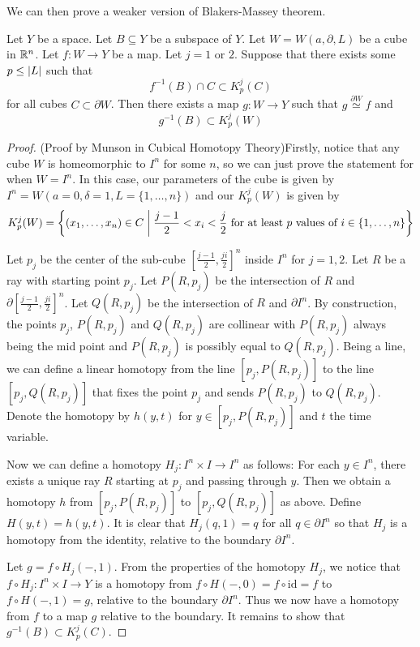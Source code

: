 We can then prove a weaker version of Blakers-Massey theorem. 

\begin{lmm}{}{} Let $Y$ be a space. Let $B\subseteq Y$ be a subspace of $Y$. Let $W=W(a,\partial, L)$ be a cube in $\mathbb{R}^n$. Let $f:W\to Y$ be a map. Let $j=1$ or $2$. Suppose that there exists some $p\leq\abs{L}$ such that $$f^{-1}(B)\cap C\subset K_p^j(C)$$ for all cubes $C\subset\partial W$. Then there exists a map $g:W\to Y$ such that $g\overset{\partial W}{\simeq} f$ and $$g^{-1}(B)\subset K_p^j(W)$$ 
\begin{proof}
(Proof by Munson in Cubical Homotopy Theory)Firstly, notice that any cube $W$ is homeomorphic to $I^n$ for some $n$, so we can just prove the statement for when $W=I^n$. In this case, our parameters of the cube is given by $I^n=W(a=0,\delta=1,L=\{1,\dots,n\})$ and our $K_p^j(W)$ is given by $$K_p^j(W)=\left\{(x_1,\dots,x_n)\in C\;\bigg{|}\;\frac{j-1}{2}<x_i<\frac{j}{2}\text{ for at least }p\text{ values of }i\in\{1,\dots,n\}\right\}$$

Let $p_j$ be the center of the sub-cube $\left[\frac{j-1}{2},\frac{ji}{2}\right]^n$ inside $I^n$ for $j=1,2$. Let $R$ be a ray with starting point $p_j$. Let $P(R,p_j)$ be the intersection of $R$ and $\partial\left[\frac{j-1}{2},\frac{ji}{2}\right]^n$. Let $Q(R,p_j)$ be the intersection of $R$ and $\partial I^n$. By construction, the points $p_j$, $P(R,p_j)$ and $Q(R,p_j)$ are collinear with $P(R,p_j)$ always being the mid point and $P(R,p_j)$ is possibly equal to $Q(R,p_j)$. Being a line, we can define a linear homotopy from the line $[p_j,P(R,p_j)]$ to the line $[p_j,Q(R,p_j)]$ that fixes the point $p_j$ and sends $P(R,p_j)$ to $Q(R,p_j)$. Denote the homotopy by $h(y,t)$ for $y\in[p_j,P(R,p_j)]$ and $t$ the time variable. 

Now we can define a homotopy $H_j:I^n\times I\to I^n$ as follows: For each $y\in I^n$, there exists a unique ray $R$ starting at $p_j$ and passing through $y$. Then we obtain a homotopy $h$ from $[p_j,P(R,p_j)]$ to $[p_j,Q(R,p_j)]$ as above. Define $H(y,t)=h(y,t)$. It is clear that $H_j(q,1)=q$ for all $q\in\partial I^n$ so that $H_j$ is a homotopy from the identity, relative to the boundary $\partial I^n$. 

Let $g=f\circ H_j(-,1)$. From the properties of the homotopy $H_j$, we notice that $f\circ H_j:I^n\times I\to Y$ is a homotopy from $f\circ H(-,0)=f\circ\text{id}=f$ to $f\circ H(-,1)=g$, relative to the boundary $\partial I^n$. Thus we now have a homotopy from $f$ to a map $g$ relative to the boundary. It remains to show that $g^{-1}(B)\subset K_p^j(C)$. 


\end{proof}
\end{lmm}
